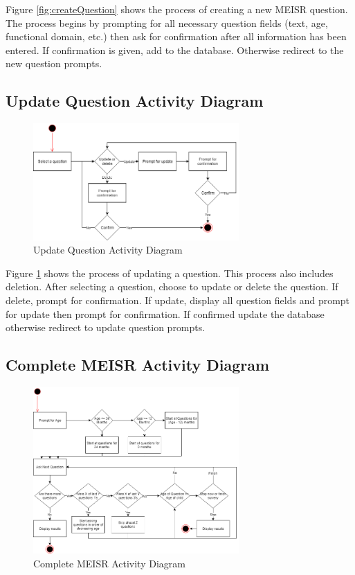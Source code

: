 Figure \ref{fig:createQuestion} shows the process of creating a new MEISR question. The process begins by prompting for all necessary question fields (text, age, functional domain, etc.) then ask for confirmation after all information has been entered. If confirmation is given, add to the database. Otherwise redirect to the new question prompts.

\subsection{Update Question Activity Diagram}

\begin{figure}[h]
  \centering
  \includegraphics[width=0.7\textwidth]{images/Update_Question_Activity_Diagram.png}
  \caption{Update Question Activity Diagram}
  \label{fig:updateQuestion}
\end{figure}

Figure \ref{fig:updateQuestion} shows the process of updating a question. This process also includes deletion. After selecting a question, choose to update or delete the question. If delete, prompt for confirmation. If update, display all question fields and prompt for update then prompt for confirmation. If confirmed update the database otherwise redirect to update question prompts.

\subsection{Complete MEISR Activity Diagram}

\begin{figure}[h]
  \centering
  \includegraphics[width=0.7\textwidth]{images/Complete_MEISR_Activity_Diagram.png}
  \caption{Complete MEISR Activity Diagram}
  \label{fig:completeMEISR}
\end{figure}

